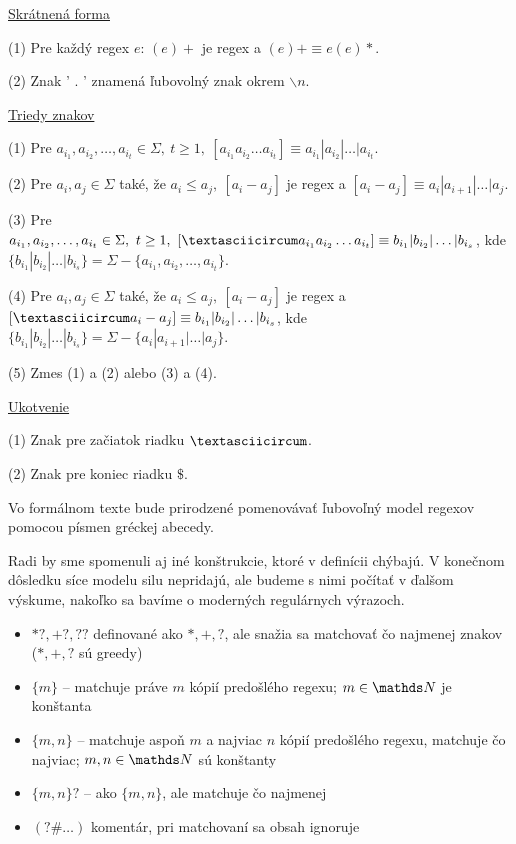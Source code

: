 \underline{Skrátnená forma}
\begin{list}{}{}
\item[(1)] Pre každý regex $e$: $(e)+$ je regex a $(e)+ \equiv e(e)*$.
\item[(2)] Znak ' . ' znamená ľubovolný znak okrem $\backslash n$.
\end{list}

\underline{Triedy znakov}
\begin{list}{}{}
\item[(1)] Pre $a_{i_1},a_{i_2},\dots ,a_{i_t} \in \Sigma,~t \geq 1,~\left[ a_{i_1}a_{i_2}\dots a_{i_t} \right] \equiv a_{i_1}|a_{i_2}|\dots |a_{i_t} $.
\item[(2)] Pre $a_i,a_j \in \Sigma$ také, že $a_i\leq a_j,~ [a_i-a_j]$ je regex a $[a_i-a_j]\equiv a_i|a_{i+1}|\dots |a_j$.
\item[(3)] Pre $a_{i_1},a_{i_2},\dots ,a_{i_t} \in \Sigma,~t \geq 1,~\left[ \textasciicircum a_{i_1}a_{i_2}\dots a_{i_t} \right] \equiv b_{i_1}|b_{i_2}|\dots |b_{i_s} $, kde $\lbrace b_{i_1}|b_{i_2}|\dots |b_{i_s}\rbrace = \Sigma - \lbrace a_{i_1},a_{i_2},\dots ,a_{i_t} \rbrace$.
\item[(4)] Pre $a_i,a_j \in \Sigma$ také, že $a_i\leq a_j,~ [a_i-a_j]$ je regex a $[\textasciicircum a_i-a_j]\equiv b_{i_1}|b_{i_2}|\dots |b_{i_s}$, kde $\lbrace b_{i_1}|b_{i_2}|\dots |b_{i_s}\rbrace = \Sigma - \lbrace a_i|a_{i+1}|\dots |a_j \rbrace$.
\item[(5)] Zmes (1) a (2) alebo (3) a (4).
\end{list}

\underline{Ukotvenie}
\begin{list}{}{}
\item[(1)] Znak pre začiatok riadku $ \textasciicircum $.
\item[(2)] Znak pre koniec riadku $ \mathdollar $.
\end{list}

Vo formálnom texte bude prirodzené pomenovávať ľubovoľný model regexov pomocou písmen gréckej abecedy.

Radi by sme spomenuli aj iné konštrukcie, ktoré v definícii chýbajú. V konečnom dôsledku síce modelu silu nepridajú, ale budeme s nimi počítať v ďalšom výskume, nakoľko sa bavíme o moderných regulárnych výrazoch.

\begin{itemize}
\item $*?,+?,??$ definované ako $*,+,?$, ale snažia sa matchovať čo najmenej znakov ($*,+,?$ sú greedy)
\item $\lbrace m \rbrace$ -- matchuje práve $m$ kópií predošlého regexu; $m \in \N$ je konštanta
\item $ \lbrace m,n \rbrace$ -- matchuje aspoň $m$ a najviac $n$ kópií predošlého regexu, matchuje čo najviac; $m, n \in \N$ sú konštanty
\item $ \lbrace m,n \rbrace ?$ -- ako $ \lbrace m,n \rbrace$, ale matchuje čo najmenej
\item $(?\#\dots )$ komentár, pri matchovaní sa obsah ignoruje
\end{itemize}

